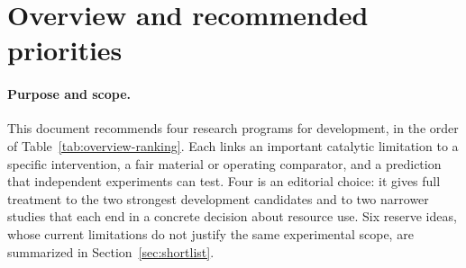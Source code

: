 \begin{abstract}
\emph{(4) Promoted Ag.} Better selectivity retention by Ni-containing Cs/Re-promoted Ag was disclosed in 1995, confounded by Cs and treatment differences, and chloride adjustment alone changes selectivity and output. New here: a composition-controlled test of when Ni adds ethylene oxide output that chloride operation cannot replace, and a prediction of when a chloride recovery step pays. At fixed output, raising selectivity from 0.90 to 0.91 would cut reaction-level oxygen use by 4.40\% and \COtwo{} formation by 10.99\%.

The rank reflects scientific value: water management and cyclic oxides are the first and second priorities, although polymer ethenolysis and promoted Ag may be quicker first experiments where equipment exists. A program expands only if its measurements predict useful output under a condition withheld from fitting.
\end{abstract}
\clearpage
\tableofcontents
\clearpage

\section*{Overview and recommended priorities}

\paragraph{Purpose and scope.}
This document recommends four research programs for development, in the order of Table~\ref{tab:overview-ranking}. Each links an important catalytic limitation to a specific intervention, a fair material or operating comparator, and a prediction that independent experiments can test. Four is an editorial choice: it gives full treatment to the two strongest development candidates and to two narrower studies that each end in a concrete decision about resource use. Six reserve ideas, whose current limitations do not justify the same experimental scope, are summarized in Section~\ref{sec:shortlist}.

